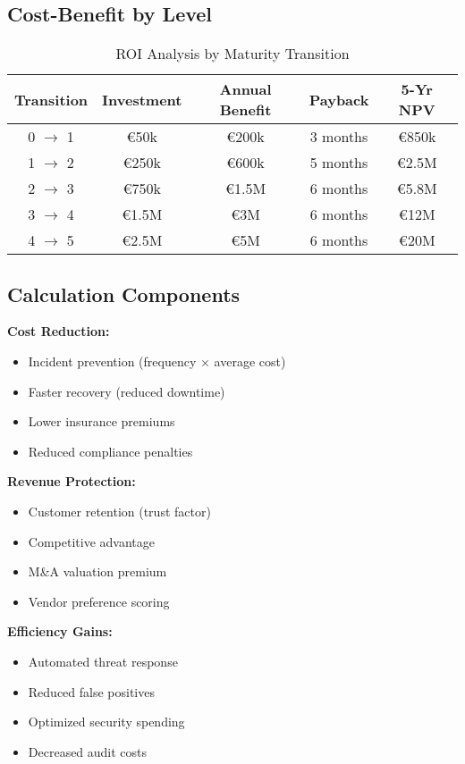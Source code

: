 \documentclass[11pt,a4paper]{article}
\begin{document}
\subsection{Cost-Benefit by Level}

\begin{table}[h]
\centering
\caption{ROI Analysis by Maturity Transition}
\small
\begin{tabular}{ccccc}
\toprule
\textbf{Transition} & \textbf{Investment} & \textbf{Annual Benefit} & \textbf{Payback} & \textbf{5-Yr NPV} \\
\midrule
0 $\rightarrow$ 1 & €50k & €200k & 3 months & €850k \\
1 $\rightarrow$ 2 & €250k & €600k & 5 months & €2.5M \\
2 $\rightarrow$ 3 & €750k & €1.5M & 6 months & €5.8M \\
3 $\rightarrow$ 4 & €1.5M & €3M & 6 months & €12M \\
4 $\rightarrow$ 5 & €2.5M & €5M & 6 months & €20M \\
\bottomrule
\end{tabular}
\end{table}

\subsection{Calculation Components}

\textbf{Cost Reduction:}
\begin{itemize}
\item Incident prevention (frequency $\times$ average cost)
\item Faster recovery (reduced downtime)
\item Lower insurance premiums
\item Reduced compliance penalties
\end{itemize}

\textbf{Revenue Protection:}
\begin{itemize}
\item Customer retention (trust factor)
\item Competitive advantage
\item M\&A valuation premium
\item Vendor preference scoring
\end{itemize}

\textbf{Efficiency Gains:}
\begin{itemize}
\item Automated threat response
\item Reduced false positives
\item Optimized security spending
\item Decreased audit costs
\end{itemize}
\end{document}
